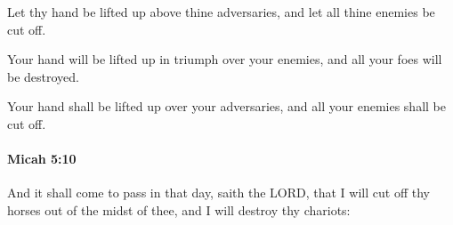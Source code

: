 			\begin{versebox}
					\item[BHS] 
					\item[LXX] 
					\item[ASV] Let thy hand be lifted up above thine adversaries, and let all thine enemies be cut off.
					\item[NIV] Your hand will be lifted up in triumph over your enemies, and all your foes will be destroyed.
					\item[NRSV] Your hand shall be lifted up over your adversaries, and all your enemies shall be cut off.
			\end{versebox}

		\paragraph{Micah 5:10} %
			\label{MICAH-5-10}

			And it shall come to pass in that day, saith the LORD, that I will cut off thy horses out of the midst of thee, and I will destroy thy chariots:

